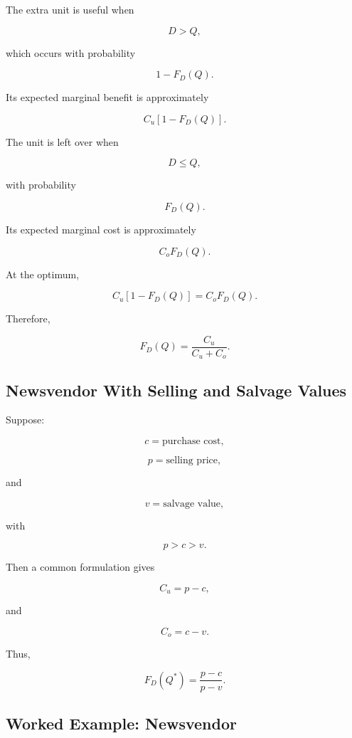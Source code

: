 The extra unit is useful when

\[
D>Q,
\]

which occurs with probability

\[
1-F_D(Q).
\]

Its expected marginal benefit is approximately

\[
C_u
[
1-F_D(Q)
].
\]

The unit is left over when

\[
D\leq Q,
\]

with probability

\[
F_D(Q).
\]

Its expected marginal cost is approximately

\[
C_oF_D(Q).
\]

At the optimum,

\[
C_u
[
1-F_D(Q)
]
=
C_oF_D(Q).
\]

Therefore,

\[
\boxed{
F_D(Q)
=
\frac{
C_u
}{
C_u+C_o
}.
}
\]

\subsection{Newsvendor With Selling and Salvage Values}
\label{subsec:newsvendor-selling-salvage}

Suppose:

\[
c
=
\text{purchase cost},
\]

\[
p
=
\text{selling price},
\]

and

\[
v
=
\text{salvage value},
\]

with

\[
p>c>v.
\]

Then a common formulation gives

\[
\boxed{
C_u
=
p-c,
}
\]

and

\[
\boxed{
C_o
=
c-v.
}
\]

Thus,

\[
\boxed{
F_D(Q^*)
=
\frac{
p-c
}{
p-v
}.
}
\]

\subsection{Worked Example: Newsvendor}
\label{subsec:worked-newsvendor}

